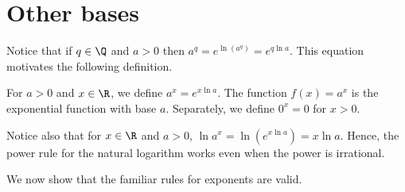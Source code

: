 \section{Other bases}{}{}

Notice that if $q\in \Q$ and $a>0$ then
$a^q = e^{\ln (a^q ) } = e^{q\ln a }$.
This equation motivates the following definition.

\begin{definition}
For $a>0 $ and $x\in\R$, we define
$a^x = e^{x\ln a}$. The function $f(x)=a^x $ is the exponential function
 with base $a$.
Separately, we define $0^x =0 $ for $x>0 $.
\end{definition}

Notice also that for $x\in \R$ and $a>0$,
$\ln a^x = \ln (e^{x\ln a }) = x\ln a$.
Hence, the power rule for the natural logarithm works even when the
power is irrational.

We now show that the familiar rules for exponents are valid.


